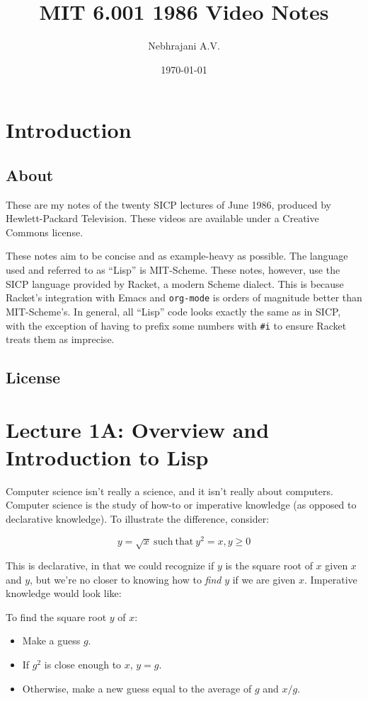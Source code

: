 \documentclass[9pt]{report}
\author{Nebhrajani A.V.}
\date{\today}
\title{MIT 6.001 1986 Video Notes}
\begin{document}
\maketitle
\tableofcontents


\chapter{Introduction}
\label{sec:orgf3cee9d}

\section{About}
\label{sec:orgd39386f}
These are my notes of the twenty SICP lectures of June 1986,
produced by Hewlett-Packard Television. These videos are available
under a Creative Commons license.

These notes aim to be concise and as example-heavy as possible. The
language used and referred to as ``Lisp'' is MIT-Scheme. These notes,
however, use the SICP language provided by Racket, a modern Scheme
dialect. This is because Racket's integration with Emacs and
\texttt{org-mode} is orders of magnitude better than MIT-Scheme's. In
general, all ``Lisp'' code looks exactly the same as in SICP, with the
exception of having to prefix some numbers with \texttt{\#i} to ensure
Racket treats them as imprecise.

\section{License}
\label{sec:org57ce4f8}
\doclicenseThis

\chapter{Lecture 1A: Overview and Introduction to Lisp}
\label{sec:orgd5db2d2}

Computer science isn't really a science, and it isn't really about
computers. Computer science is the study of how-to or imperative
knowledge (as opposed to declarative knowledge). To illustrate the
difference, consider:

$$y = \sqrt{x} \mathrm{~such~that~} y^2=x, y \geq 0$$

This is declarative, in that we could recognize if \(y\) is the square
root of \(x\) given \(x\) and \(y\), but we're no closer to knowing how to
\emph{find} \(y\) if we are given \(x\). Imperative knowledge would look
like:

To find the square root \(y\) of \(x\):
\begin{itemize}
\item Make a guess \(g\).
\item If \(g^2\) is close enough to \(x\), \(y=g\).
\item Otherwise, make a new guess equal to the average of \(g\) and \(x/g\).
\end{itemize}
\end{document}
